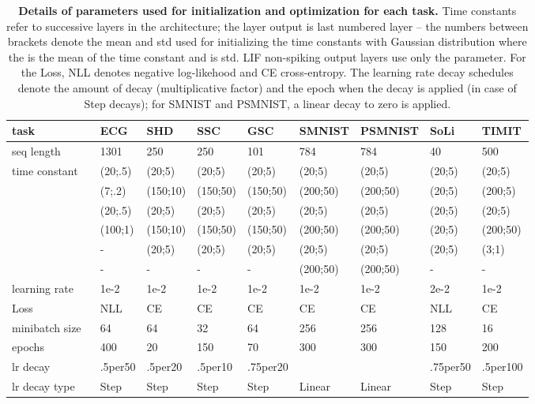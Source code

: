 \documentclass[fleqn,10pt]{wlscirep}
\begin{document}
\begin{table}[hb]
\centering
\caption{\textbf{Details of parameters used for initialization and optimization for each task.} Time constants refer to successive layers in the architecture; the layer output is last numbered layer -- the numbers between brackets denote the mean and std used for initializing the time constants with Gaussian distribution  where the  is the mean of the time constant and  is std. LIF non-spiking output layers use only the  parameter. For the Loss, NLL denotes negative log-likehood and CE cross-entropy. The learning rate decay schedules denote the amount of decay (multiplicative factor) and the epoch when the decay is applied (in case of Step decays); for SMNIST and PSMNIST, a linear decay to zero is applied.}
\begin{tabular}{|l|l|l|l|l|l|l|l|l|l|}
\hline
\multicolumn{2}{|l|}{task}                 & ECG & SHD & SSC & GSC & SMNIST & PSMNIST & SoLi & TIMIT \\ \hline
\multicolumn{2}{|l|}{seq length}           &1301 &250  &250 &101 &784        &784         &40  &500       \\ \hline
\multirow{6}{*}{time constant} &   &(20;.5) &(20;5)&(20;5) &(20;5) &(20;5) &(20;5)  & (20;5)     &(20;5)       \\ \cline{2-10} 
                              &&(7;.2)&(150;10)&(150;50) &(150;50) &(200;50)    &(200;50)  &(20;5)      &(200;5)       \\ \cline{2-10} 
                               &   &(20;.5)&(20;5)&(20;5)&(20;5) &(20;5)    &(20;5)    & (20;5)     &(20;5)       \\ \cline{2-10} 
                              &&(100;1)&(150;10)&(150;50) &(150;50)&(200;50)&(200;50)  &(20;5)      &(200;50)       \\ \cline{2-10} 
                               &   & -  &(20;5)&(20;5)&(20;5)&(20;5)  &(20;5)    &(20;5)      &(3;1)  \\ \cline{2-10} 
                              && -  &  -  &  -   & -   &(200;50) &(200;50)   &   -   &  -     \\ \hline
\multicolumn{2}{|l|}{learning rate}        &1e-2 &1e-2 &1e-2 &1e-2&1e-2        &1e-2 &2e-2 &1e-2   \\ \hline
\multicolumn{2}{|l|}{Loss}                 &NLL &CE &CE &CE&CE    &CE     &NLL  &CE   \\ \hline
\multicolumn{2}{|l|}{minibatch size}        &64  &64   &32  &64&256        &256         &128 &16    \\ \hline
\multicolumn{2}{|l|}{epochs}               &400 &20  &150 &70 &300        &300         &150  &200       \\ \hline
\multicolumn{2}{|l|}{lr decay}             &.5per50    &.5per20  &.5per10 &.75per20 &        &         &.75per50  &.5per100       \\ \hline
\multicolumn{2}{|l|}{lr decay type}        &Step    &Step  &Step &Step &Linear        &Linear        &Step  &Step       \\ \hline
\end{tabular}
\label{tab:params}
\end{table}
\end{document}
